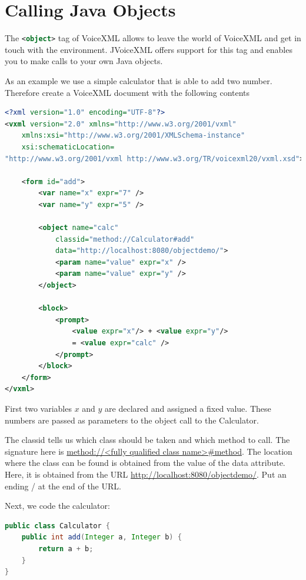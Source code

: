 \documentclass[11pt,a4paper]{book}
\begin{document}
\section{Calling Java Objects}

The \lstinline[language=XML]{<object>} tag of VoiceXML allows to leave the world
of VoiceXML and get in touch with the environment. JVoiceXML offers support for
this tag and enables you to make calls to your own Java objects.

As an example we use a simple calculator that is able to add two number.
Therefore create a VoiceXML document with the following contents

\begin{lstlisting}[language=XML]
<?xml version="1.0" encoding="UTF-8"?>
<vxml version="2.0" xmlns="http://www.w3.org/2001/vxml"
    xmlns:xsi="http://www.w3.org/2001/XMLSchema-instance"
    xsi:schematicLocation=
"http://www.w3.org/2001/vxml http://www.w3.org/TR/voicexml20/vxml.xsd">

    <form id="add">
        <var name="x" expr="7" />
        <var name="y" expr="5" />

        <object name="calc"
            classid="method://Calculator#add"
            data="http://localhost:8080/objectdemo/">
            <param name="value" expr="x" />
            <param name="value" expr="y" />
        </object>

        <block>
            <prompt>
                <value expr="x"/> + <value expr="y"/>
                = <value expr="calc" />
            </prompt>
        </block>
    </form>
</vxml>
\end{lstlisting}

First two variables $x$ and $y$ are declared and assigned a fixed value. These
numbers are passed as parameters to the object call to the Calculator.

The classid tells us which class should be taken and which method to call. The
signature here is \url{method://<fully qualified class name>#method}.
The location where the class can be found is obtained from the value of the data
attribute. Here, it is obtained from the URL
\url{http://localhost:8080/objectdemo/}. Put an ending / at the end
of the URL.

Next, we code the calculator:
\begin{lstlisting}[language=Java]
public class Calculator {
    public int add(Integer a, Integer b) {
        return a + b;
    }
}
\end{lstlisting}
\end{document}
